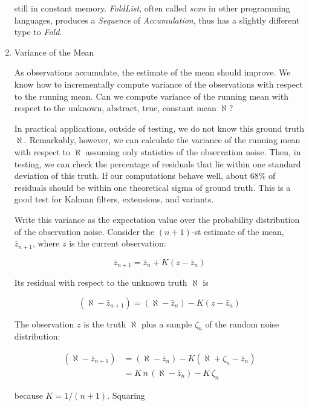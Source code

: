 \documentclass[10pt,oneside,x11names]{article}
\begin{document}
\begin{enumerate}
\noindent still in constant memory. \emph{FoldList}, often called \emph{scan} in other
programming languages, produces a \emph{Sequence} of \emph{Accumulation}, thus has a
slightly different type to \emph{Fold}.

\item Variance of the Mean
\label{sec:orgheadline11}

As observations accumulate, the estimate of the mean should improve. We know
how to incrementally compute variance of the observations with respect
to the running mean. Can we compute variance of the running mean with respect
to the unknown, abstract, true, constant mean \(\aleph\)?

In practical applications, outside of testing, we do not know this ground truth
\(\aleph\). Remarkably, however, we can calculate the variance of the running mean
with respect to \(\aleph\) assuming only statistics of the observation noise.
Then, in testing, we can check the percentage of residuals that lie within one
standard deviation of this truth. If our computations behave well, about 68\% of
residuals should be within one theoretical sigma of ground truth. This is a good
test for Kalman filters, extensions, and variants.

Write this variance as the expectation value over the probability distribution
of the observation noise.
Consider the \((n+1)\)-st estimate of the mean, \(\bar{z}_{n+1}\), where
\(z\) is the current observation:

\begin{equation*}
\bar{z}_{n+1} = \bar{z}_n + K (z-\bar{z}_n)
\end{equation*}

\noindent Its residual with respect to the unknown truth \(\aleph\) is

\begin{equation*}
(\aleph-\bar{z}_{n+1}) = (\aleph-\bar{z}_n) - K (z-\bar{z}_n)
\end{equation*}

\noindent The observation \(z\) is the truth \(\aleph\) plus a sample \(\zeta_n\) of
the random noise distribution:

\begin{align*}
(\aleph-\bar{z}_{n+1})
&=
(\aleph-\bar{z}_n) - K (\aleph+\zeta_n-\bar{z}_n) \\
&=
K\, n\, (\aleph - \bar{z}_n)-K\,\zeta_n
\end{align*}

\noindent because \(K=1/(n+1)\). Squaring


\end{enumerate}
\end{document}
